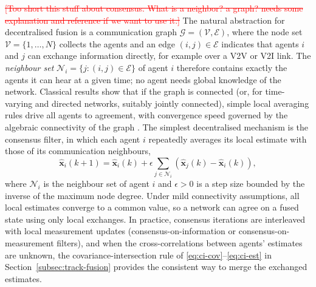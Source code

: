\documentclass{ieeeaccess}
\newcommand{\deleted}[1]{\textcolor{red}{\sout{#1}}}
\newcommand{\addednew}[1]{\textcolor{RevisionOlive}{#1}}
\begin{document}
\deleted{[Too short this stuff about consensus. What is a neighbor? a graph? needs some explanation and reference if we want to use it.]}
\addednew{The natural abstraction for decentralised fusion is a communication graph $\mathcal{G}=(\mathcal{V},\mathcal{E})$, where the node set $\mathcal{V}=\{1,\dots,N\}$ collects the agents and an edge $(i,j)\in\mathcal{E}$ indicates that agents $i$ and $j$ can exchange information directly, for example over a V2V or V2I link. The \emph{neighbour set} $\mathcal{N}_i=\{j:(i,j)\in\mathcal{E}\}$ of agent $i$ therefore contains exactly the agents it can hear at a given time; no agent needs global knowledge of the network. Classical results show that if the graph is connected (or, for time-varying and directed networks, suitably jointly connected), simple local averaging rules drive all agents to agreement, with convergence speed governed by the algebraic connectivity of the graph \cite{olfatisaber2007_consensus,ren2005_consensus}.}
{\color{blue}
The simplest decentralised mechanism is the consensus filter, in which each agent $i$ repeatedly averages its local estimate with those of its communication neighbours,
\begin{equation}
\widehat{\mathbf{x}}_i(k+1)=\widehat{\mathbf{x}}_i(k)+\epsilon\sum_{j\in\mathcal{N}_i}\left(\widehat{\mathbf{x}}_j(k)-\widehat{\mathbf{x}}_i(k)\right),
\label{eq:consensus-filter}
\end{equation}
where $\mathcal{N}_i$ is the neighbour set of agent $i$ and $\epsilon>0$ is a step size bounded by the inverse of the maximum node degree. Under mild connectivity assumptions, all local estimates converge to a common value, so a network can agree on a fused state using only local exchanges. In practice, consensus iterations are interleaved with local measurement updates (consensus-on-information or consensus-on-measurement filters), and when the cross-correlations between agents' estimates are unknown, the covariance-intersection rule of \eqref{eq:ci-cov}--\eqref{eq:ci-est} in Section~\ref{subsec:track-fusion} provides the consistent way to merge the exchanged estimates.
}
\end{document}
